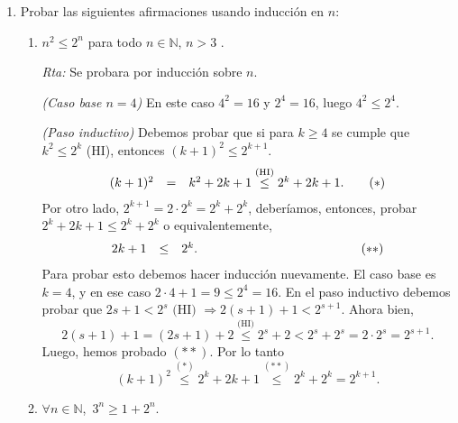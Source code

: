 \documentclass[a4paper,12pt,twoside,spanish,reqno]{amsbook}
\numberwithin{equation}{section}
\newcommand{\rta}{\noindent\textit{Rta: }}
\begin{document}
\begin{enumerate}[resume]
    

        
        
        \item Probar las siguientes afirmaciones usando inducción en $n$:
        \begin{enumerate}
            \item $n^2\leq 2^n$ para todo $n\in{\mathbb N}$, $n>3$ .
            
            \rta  Se probara por inducción sobre $n$. 
            
            \textit{(Caso base $n=4$) } En  este caso $4^2 = 16$ y $2^4 = 16$, luego $4^2 \le 2^4$.
            
            \textit{(Paso inductivo)} Debemos probar que si para $k \ge 4$ se cumple  que  $k^2\leq 2^k$ (HI),  entonces $(k+1)^2\leq 2^{k+1}$. 
            \begin{equation*}
            \begin{array}{rclr}
            (k+1)^2 &=& k^2 + 2k +1 \overset{\text{(HI)}}{\le} 2^k +2k +1. \hfill &\quad \hfill(*)
            \end{array}
            \end{equation*}
            Por otro lado, $2^{k+1} = 2 \cdot 2^k = 2^k + 2^k$, deberíamos,  entonces,  probar $2^k +2k +1 \le 2^k +2^k$ o equivalentemente, 
            \begin{equation*}
            \begin{array}{rclr}
            2k +1   &\le&2^k. \hfill &\qquad\qquad\qquad\qquad\qquad\qquad \hfill\hfill(**)
            \end{array}
            \end{equation*}
            Para probar esto debemos hacer inducción nuevamente. El caso base es $k=4$, y en ese caso $2\cdot 4+ 1 = 9 \le 2^4 = 16$. En  el paso inductivo debemos probar que $2s+ 1 < 2^s \text{ (HI) } \Rightarrow 2(s+1)+ 1 < 2^{s+1}$. Ahora bien, 
            \begin{equation*}
            2(s+1)+ 1  = (2s + 1) +2 \overset{\text{(HI)}}{\le} 2^s + 2 < 2^s + 2^s = 2\cdot 2^s = 2^{s+1}. 
            \end{equation*}    
            Luego,  hemos probado $(**)$. Por lo tanto
            \begin{equation*}
            (k+1)^2 \overset{(*)}{\le}  2^k +2k +1 \overset{(**)}{\le} 2^k + 2^k = 2^{k+1}.
            \end{equation*}
            
            
            \item $\forall n \in {\mathbb N}$,\ $3^n \ge 1 + 2^n$.
            

\end{enumerate}
\end{enumerate}
\end{document}
